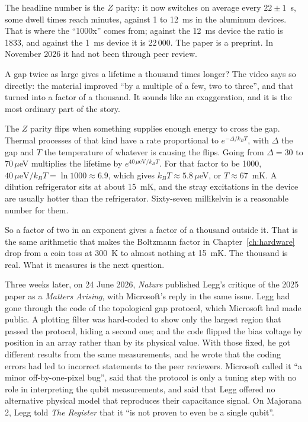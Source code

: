 The headline number is the $Z$ parity: it now switches on average every $22 \pm 1$~s, some
dwell times reach minutes, against 1 to 12~ms in the aluminum devices. That is where the
``1000x'' comes from; against the 12~ms device the ratio is 1833, and against the 1~ms device
it is 22\,000. The paper is a preprint. In November 2026 it had not been through peer review.

\begin{reflection}{A gap twice as large gives a lifetime a thousand times longer?}
The video says so directly: the material improved ``by a multiple of a few, two to three'',
and that turned into a factor of a thousand. It sounds like an exaggeration, and it is the
most ordinary part of the story.

The $Z$ parity flips when something supplies enough energy to cross the gap. Thermal
processes of that kind have a rate proportional to $e^{-\Delta/k_B T}$, with $\Delta$ the gap
and $T$ the temperature of whatever is causing the flips. Going from $\Delta = 30$ to
$70\,\mu$eV multiplies the lifetime by $e^{40\,\mu\mathrm{eV}/k_B T}$. For that factor to be
1000, $40\,\mu\mathrm{eV}/k_B T = \ln 1000 \approx 6.9$, which gives $k_B T \approx
5.8\,\mu$eV, or $T \approx 67$~mK. A dilution refrigerator sits at about 15~mK, and the stray
excitations in the device are usually hotter than the refrigerator. Sixty-seven millikelvin is
a reasonable number for them.

So a factor of two in an exponent gives a factor of a thousand outside it. That is the same
arithmetic that makes the Boltzmann factor in Chapter~\ref{ch:hardware} drop from a coin toss
at 300~K to almost nothing at 15~mK. The thousand is real. What it measures is the next
question.
\end{reflection}

Three weeks later, on 24 June 2026, \emph{Nature} published Legg's critique of the 2025 paper
as a \emph{Matters Arising}, with Microsoft's reply in the same issue. Legg had gone through
the code of the topological gap protocol, which Microsoft had made public. A plotting filter
was hard-coded to show only the largest region that passed the protocol, hiding a second one;
and the code flipped the bias voltage by position in an array rather than by its physical
value. With those fixed, he got different results from the same measurements, and he wrote
that the coding errors had led to incorrect statements to the peer reviewers. Microsoft
called it ``a minor off-by-one-pixel bug'', said that the protocol is only a tuning step with
no role in interpreting the qubit measurements, and said that Legg offered no alternative
physical model that reproduces their capacitance signal. On Majorana 2, Legg told \emph{The
Register} that it ``is not proven to even be a single qubit''.

